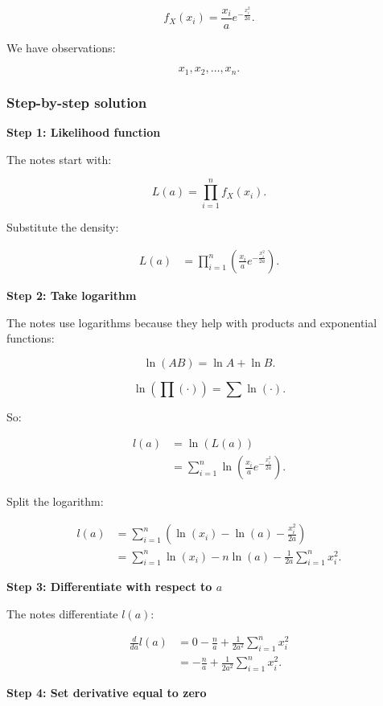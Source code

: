 \documentclass[10pt]{article}
\begin{document}
\[
f_X(x_i)
=
\frac{x_i}{a}
e^{-\frac{x_i^2}{2a}}.
\]

We have observations:

\[
x_1,x_2,\ldots,x_n.
\]

\subsubsection*{Step-by-step solution}

\textbf{Step 1: Likelihood function}

The notes start with:

\[
L(a)=
\prod_{i=1}^{n} f_X(x_i).
\]

Substitute the density:

\begin{align*}
L(a)
&=
\prod_{i=1}^{n}
\left(
\frac{x_i}{a}
e^{-\frac{x_i^2}{2a}}
\right).
\end{align*}

\textbf{Step 2: Take logarithm}

The notes use logarithms because they help with
products and exponential functions:

\[
\ln(AB)=\ln A+\ln B.
\]

\[
\ln\left(\prod(\cdot)\right)
=
\sum \ln(\cdot).
\]

So:

\begin{align*}
l(a)
&=\ln(L(a)) \\[2mm]
&=
\sum_{i=1}^{n}
\ln\left(
\frac{x_i}{a}
e^{-\frac{x_i^2}{2a}}
\right).
\end{align*}

Split the logarithm:

\begin{align*}
l(a)
&=
\sum_{i=1}^{n}
\left(
\ln(x_i)-\ln(a)
-\frac{x_i^2}{2a}
\right) \\[2mm]
&=
\sum_{i=1}^{n}\ln(x_i)
-n\ln(a)
-\frac{1}{2a}
\sum_{i=1}^{n}x_i^2.
\end{align*}

\textbf{Step 3: Differentiate with respect to \(a\)}

The notes differentiate \(l(a)\):

\begin{align*}
\frac{d}{da}l(a)
&=
0-\frac{n}{a}
+
\frac{1}{2a^2}
\sum_{i=1}^{n}x_i^2 \\[2mm]
&=
-\frac{n}{a}
+
\frac{1}{2a^2}
\sum_{i=1}^{n}x_i^2.
\end{align*}

\textbf{Step 4: Set derivative equal to zero}
\end{document}

